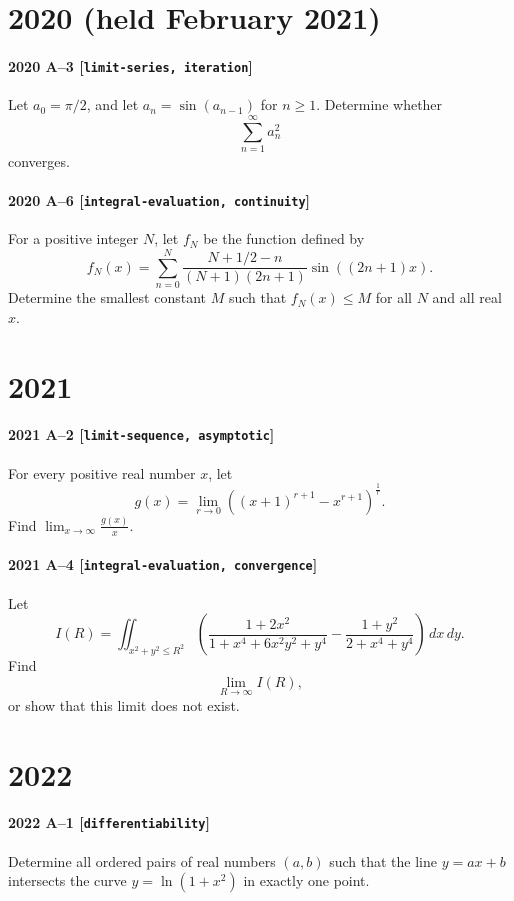 \documentclass[11pt]{article}
\begin{document}
\section*{2020 (held February 2021)}

\paragraph{2020 A--3 \textnormal{[\texttt{limit-series, iteration}]}}
Let $a_0 = \pi/2$, and let $a_n = \sin(a_{n-1})$ for $n \geq 1$. Determine whether
\[
\sum_{n=1}^\infty a_n^2
\]
converges.

\paragraph{2020 A--6 \textnormal{[\texttt{integral-evaluation, continuity}]}}
For a positive integer $N$, let $f_N$ be the function defined by
\[
f_N(x) = \sum_{n=0}^N \frac{N+1/2-n}{(N+1)(2n+1)} \sin((2n+1)x).
\]
Determine the smallest constant $M$ such that $f_N(x) \leq M$ for all $N$ and all real $x$.

\section*{2021}

\paragraph{2021 A--2 \textnormal{[\texttt{limit-sequence, asymptotic}]}}
For every positive real number $x$, let
\[
g(x) = \lim_{r \to 0} ((x+1)^{r+1} - x^{r+1})^{\frac{1}{r}}.
\]
Find $\lim_{x \to \infty} \frac{g(x)}{x}$.

\paragraph{2021 A--4 \textnormal{[\texttt{integral-evaluation, convergence}]}}
Let
\[
I(R) = \iint_{x^2+y^2 \leq R^2} \left( \frac{1+2x^2}{1+x^4+6x^2y^2+y^4} - \frac{1+y^2}{2+x^4+y^4} \right)\,dx\,dy.
\]
Find
\[
\lim_{R \to \infty} I(R),
\]
or show that this limit does not exist.

\section*{2022}

\paragraph{2022 A--1 \textnormal{[\texttt{differentiability}]}}
Determine all ordered pairs of real numbers $(a,b)$ such that the line $y = ax+b$ intersects the curve $y = \ln(1+x^2)$ in exactly one point.
\end{document}
